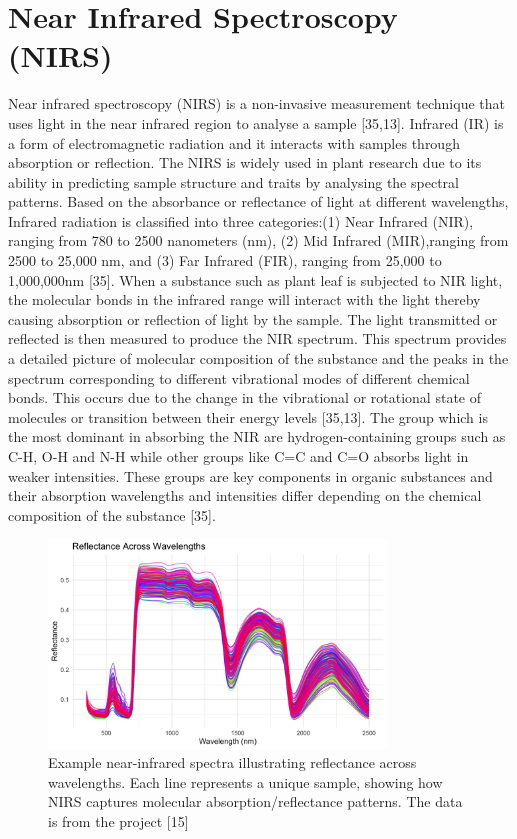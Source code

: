 \documentclass[12pt,a4paper]{report}
\begin{document}
\section{Near Infrared Spectroscopy (NIRS)}
Near infrared spectroscopy (NIRS) is a non-invasive measurement technique that uses light in
the near infrared region to analyse a sample [35,13]. Infrared (IR) is a form of electromagnetic
radiation and it interacts with samples through absorption or reflection. The NIRS is widely
used in plant research due to its ability in predicting sample structure and traits by analysing
the spectral patterns. Based on the absorbance or reflectance of light at different wavelengths, Infrared radiation is classified into three categories:(1) Near Infrared (NIR), ranging from 780 to 2500 nanometers (nm), (2) Mid Infrared (MIR),ranging from 2500 to 25,000 nm, and (3) Far Infrared (FIR), ranging from 25,000 to 1,000,000nm [35]. When a substance such as plant leaf is subjected to NIR light, the molecular bonds in the infrared range will interact with the light thereby causing absorption or reflection of light by the sample. The light transmitted or reflected is then measured to produce the NIR spectrum. This spectrum provides a detailed picture of molecular composition of the substance and the peaks in the spectrum corresponding to different vibrational modes of different chemical bonds. This occurs due to the change in the vibrational or rotational state of molecules or transition between their energy levels [35,13]. The group which is the most dominant in absorbing the NIR are hydrogen-containing groups such as C-H, O-H and N-H while other groups like C=C and C=O absorbs light in weaker intensities. These groups are key components in organic substances and their absorption wavelengths and intensities differ depending on the chemical composition of the substance [35].\\ 

\begin{figure}[h]
    \centering
    \includegraphics[width=0.8\textwidth]{Figures/pablo_data.png} 
    \caption{Example near-infrared spectra illustrating reflectance across wavelengths. Each line represents a unique sample, showing how NIRS captures molecular absorption/reflectance patterns. The data is from the project [15]}
    \label{fig:nirs_spectra}
\end{figure}
\end{document}
